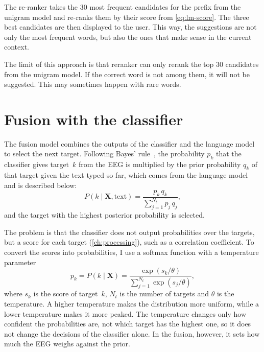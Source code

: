 The re-ranker takes the 30 most frequent candidates for the prefix from the unigram
model and re-ranks them by their score from \cref{eq:lm-score}. The three best
candidates are then displayed to the user. This way, the suggestions are not only the
most frequent words, but also the ones that make sense in the current context.

The limit of this approach is that reranker can only rerank the top 30 candidates from 
the unigram model. If the correct word is not among them, it will not be suggested. 
This may sometimes happen with rare words.

\section{Fusion with the classifier}
\label{sec:fusion}

The fusion model combines the outputs of the classifier and the language model to
select the next target. Following Bayes' rule~\citep{speier2016review}, the probability
$p_k$ that the classifier gives target~$k$ from the \ac{EEG} is multiplied by the prior
probability $q_k$ of that target given the text typed so far, which comes from the
language model and is described below:
\begin{equation}
    P(k \mid \mathbf{X}, \text{text}) = \frac{p_k\, q_k}{\sum_{j=1}^{N_t} p_j\, q_j},
    \label{eq:fusion}
\end{equation}
and the target with the highest posterior probability is selected.

The problem is that the classifier does not output probabilities over the targets,
but a score for each target (\cref{ch:processing}), such as a correlation coefficient.
To convert the scores into probabilities, I use a softmax function with a temperature
parameter
\begin{equation}
    p_k = P(k \mid \mathbf{X}) = \frac{\exp(s_k / \theta)}{\sum_{j=1}^{N_t} \exp(s_j / \theta)},
    \label{eq:softmax}
\end{equation}
where $s_k$ is the score of target~$k$, $N_t$ is the number of targets and $\theta$ is
the temperature. A higher temperature makes the distribution more uniform, while a
lower temperature makes it more peaked. The temperature changes only how confident the
probabilities are, not which target has the highest one, so it does not change the
decisions of the classifier alone. In the fusion, however, it sets how much the
\ac{EEG} weighs against the prior.

